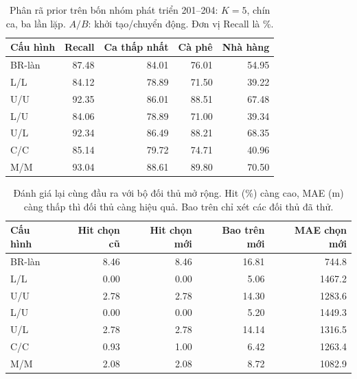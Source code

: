 \begin{table}[htbp]
\centering\small
\caption{Phân rã prior trên bốn nhóm phát triển 201--204: $K=5$, chín ca, ba lần lặp. $A/B$: khởi tạo/chuyển động. Đơn vị Recall là \%.}
\label{tab:prior-factor-utility}
\begin{tabular}{lrrrr}
\toprule
Cấu hình & Recall & Ca thấp nhất & Cà phê & Nhà hàng\\
\midrule
BR-làn & 87.48 & 84.01 & 76.01 & 54.95 \\
L/L & 84.12 & 78.89 & 71.50 & 39.22 \\
U/U & 92.35 & 86.01 & 88.51 & 67.48 \\
L/U & 84.06 & 78.89 & 71.00 & 39.34 \\
U/L & 92.34 & 86.49 & 88.21 & 68.35 \\
C/C & 85.14 & 79.72 & 74.71 & 40.96 \\
M/M & 93.04 & 88.61 & 89.80 & 70.50 \\
\bottomrule
\end{tabular}
\end{table}
\begin{table}[htbp]
\centering\small
\caption{Đánh giá lại cùng đầu ra với bộ đối thủ mở rộng. Hit (\%) càng cao, MAE (m) càng thấp thì đối thủ càng hiệu quả. Bao trên chỉ xét các đối thủ đã thử.}
\label{tab:prior-factor-attacks}
\begin{tabular}{lrrrr}
\toprule
Cấu hình & Hit chọn cũ & Hit chọn mới & Bao trên mới & MAE chọn mới\\
\midrule
BR-làn & 8.46 & 8.46 & 16.81 & 744.8 \\
L/L & 0.00 & 0.00 & 5.06 & 1467.2 \\
U/U & 2.78 & 2.78 & 14.30 & 1283.6 \\
L/U & 0.00 & 0.00 & 5.20 & 1449.3 \\
U/L & 2.78 & 2.78 & 14.14 & 1316.5 \\
C/C & 0.93 & 1.00 & 6.42 & 1263.4 \\
M/M & 2.08 & 2.08 & 8.72 & 1082.9 \\
\bottomrule
\end{tabular}
\end{table}
